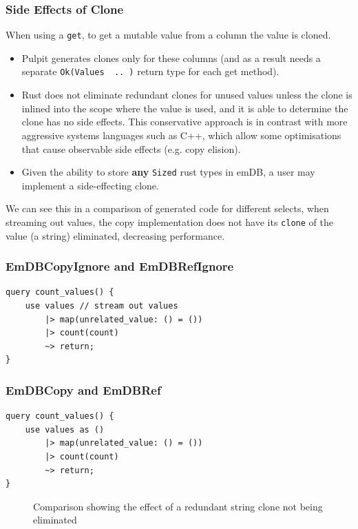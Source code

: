 \subsubsection{Side Effects of Clone}
\label{sec:clone_side_effects}
When using a \texttt{get}, to get a mutable value from a column the value is cloned.
\begin{itemize}
    \setlength\itemsep{0em}
    \item Pulpit generates clones only for these columns (and as a result needs a separate \texttt{Ok(Values { .. })} return type for each get method).
    \item Rust does not eliminate redundant clones for unused values unless the clone is inlined into the scope where the value is used, and it is able to determine the clone has no side effects.
          This conservative approach is in contrast with more aggressive systems languages such as C++, which allow some optimisations that cause observable side effects (e.g. copy elision\cite{CopyElision}).
    \item Given the ability to store \textbf{any} \texttt{Sized} rust types in emDB, a user may implement a side-effecting clone.
\end{itemize}
We can see this in a comparison of generated code for different selects, when streaming out values, the copy implementation does not have its \texttt{clone} of the value (a string) eliminated, decreasing performance.
\vspace{1cm}
\\
\begin{minipage}{.45\textwidth}
    \subsubsection{EmDBCopyIgnore and EmDBRefIgnore}
    \begin{verbatim}
query count_values() {
    use values // stream out values
        |> map(unrelated_value: () = ())
        |> count(count)
        ~> return;
}
    \end{verbatim}
\end{minipage}\hfill\begin{minipage}{.45\textwidth}
    \subsubsection{EmDBCopy and EmDBRef}
    \begin{verbatim}
query count_values() {
    use values as ()
        |> map(unrelated_value: () = ())
        |> count(count)
        ~> return;
}
    \end{verbatim}
\end{minipage}
\begin{figure}[h!]
    \centering
    \vspace{-0.4em}
    \resizebox{\textwidth}{!}{}
    \caption{Comparison showing the effect of a redundant string clone not being eliminated}
\end{figure}

